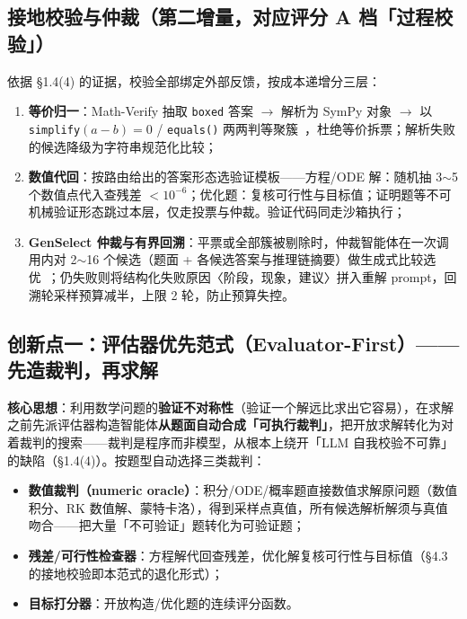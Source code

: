 \documentclass[11pt, a4paper]{ctexart}
\newcommand{\hl}[1]{\textcolor{accentred}{\textbf{#1}}}
\begin{document}
\subsection{接地校验与仲裁（第二增量，对应评分 A 档「过程校验」）}

依据 \S1.4(4) 的证据，校验全部绑定外部反馈，按成本递增分三层：

\begin{enumerate}[itemsep=0.1em]
  \item \hl{等价归一}：Math-Verify 抽取 \texttt{boxed} 答案 $\to$ 解析为 SymPy 对象 $\to$ 以 \texttt{simplify}$(a-b){=}0$ / \texttt{equals()} 两两判等聚簇~\cite{mathverify}，杜绝等价拆票；解析失败的候选降级为字符串规范化比较；
  \item \hl{数值代回}：按路由给出的答案形态选验证模板——方程/ODE 解：随机抽 3$\sim$5 个数值点代入查残差 $<10^{-6}$；优化题：复核可行性与目标值；证明题等不可机械验证形态跳过本层，仅走投票与仲裁。验证代码同走沙箱执行；
  \item \hl{GenSelect 仲裁与有界回溯}：平票或全部簇被剔除时，仲裁智能体在一次调用内对 2$\sim$16 个候选（题面 + 各候选答案与推理链摘要）做生成式比较选优~\cite{aimo2}；仍失败则将结构化失败原因〈阶段，现象，建议〉拼入重解 prompt，回溯轮采样预算减半，上限 2 轮，防止预算失控。
\end{enumerate}

\subsection{创新点一：评估器优先范式（Evaluator-First）——先造裁判，再求解}

\textbf{核心思想}：利用数学问题的\hl{验证不对称性}（验证一个解远比求出它容易），在求解之前先派评估器构造智能体\hl{从题面自动合成「可执行裁判」}，把开放求解转化为对着裁判的搜索——裁判是程序而非模型，从根本上绕开「LLM 自我校验不可靠」的缺陷（\S1.4(4)）。按题型自动选择三类裁判：

\begin{itemize}[itemsep=0.1em]
  \item \hl{数值裁判（numeric oracle）}：积分/ODE/概率题直接数值求解原问题（数值积分、RK 数值解、蒙特卡洛），得到采样点真值，所有候选解析解须与真值吻合——把大量「不可验证」题转化为可验证题；
  \item \hl{残差/可行性检查器}：方程解代回查残差，优化解复核可行性与目标值（\S4.3 的接地校验即本范式的退化形式）；
  \item \hl{目标打分器}：开放构造/优化题的连续评分函数。
\end{itemize}
\end{document}
